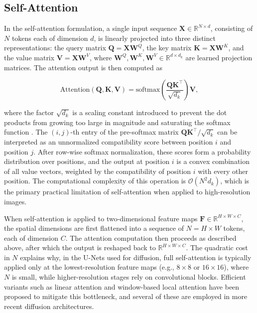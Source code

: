 \subsection{Self-Attention}
\label{subsec:self_attention}

In the self-attention formulation, a single input sequence $\mathbf{X} \in \mathbb{R}^{N \times d}$, consisting of $N$ tokens each of dimension $d$, is linearly projected into three distinct representations: the query matrix $\mathbf{Q} = \mathbf{X}\mathbf{W}^Q$, the key matrix $\mathbf{K} = \mathbf{X}\mathbf{W}^K$, and the value matrix $\mathbf{V} = \mathbf{X}\mathbf{W}^V$, where $\mathbf{W}^Q, \mathbf{W}^K, \mathbf{W}^V \in \mathbb{R}^{d \times d_k}$ are learned projection matrices. The attention output is then computed as

\begin{equation}
    \text{Attention}(\mathbf{Q}, \mathbf{K}, \mathbf{V}) = \text{softmax}\!\left(\frac{\mathbf{Q}\mathbf{K}^\top}{\sqrt{d_k}}\right)\mathbf{V},
    \label{eq:self_attention}
\end{equation}

where the factor $\sqrt{d_k}$ is a scaling constant introduced to prevent the dot products from growing too large in magnitude and saturating the softmax function \cite{vaswani2017attention}. The $(i, j)$-th entry of the pre-softmax matrix $\mathbf{Q}\mathbf{K}^\top / \sqrt{d_k}$ can be interpreted as an unnormalized compatibility score between position $i$ and position $j$. After row-wise softmax normalization, these scores form a probability distribution over positions, and the output at position $i$ is a convex combination of all value vectors, weighted by the compatibility of position $i$ with every other position. The computational complexity of this operation is $\mathcal{O}(N^2 d_k)$, which is the primary practical limitation of self-attention when applied to high-resolution images.

When self-attention is applied to two-dimensional feature maps $\mathbf{F} \in \mathbb{R}^{H \times W \times C}$, the spatial dimensions are first flattened into a sequence of $N = H \times W$ tokens, each of dimension $C$. The attention computation then proceeds as described above, after which the output is reshaped back to $\mathbb{R}^{H \times W \times C}$. The quadratic cost in $N$ explains why, in the U-Nets used for diffusion, full self-attention is typically applied only at the lowest-resolution feature maps (e.g., $8 \times 8$ or $16 \times 16$), where $N$ is small, while higher-resolution stages rely on convolutional blocks. Efficient variants such as linear attention \cite{katharopoulos2020transformers} and window-based local attention have been proposed to mitigate this bottleneck, and several of these are employed in more recent diffusion architectures.


